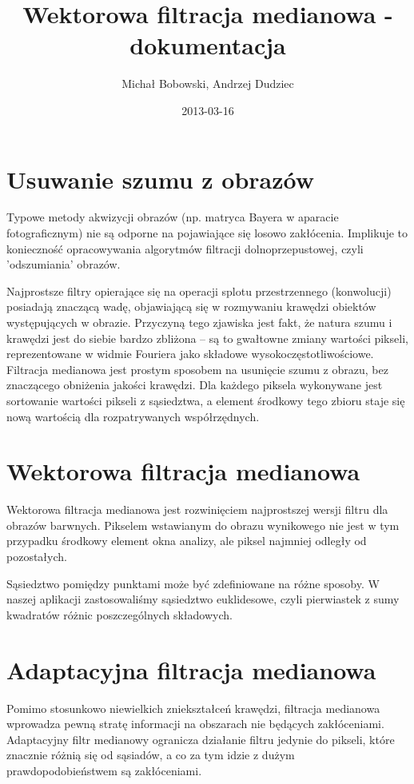 \documentclass[a4paper,12pt,oneside,notitlepage,onecolumn]{article}
\author{Michał Bobowski, Andrzej Dudziec}
\date{2013-03-16}
\title{Wektorowa filtracja medianowa - dokumentacja}
\begin{document}
  \maketitle
\section{Usuwanie szumu z obrazów}
Typowe metody akwizycji obrazów (np. matryca Bayera w aparacie fotograficznym) nie są odporne na pojawiające się losowo zakłócenia.
Implikuje to konieczność opracowywania algorytmów filtracji dolnoprzepustowej, czyli 'odszumiania' obrazów.

Najprostsze filtry opierające się na operacji splotu przestrzennego (konwolucji) posiadają znaczącą wadę, objawiającą się w rozmywaniu krawędzi obiektów występujących w obrazie.
Przyczyną tego zjawiska jest fakt, że natura szumu i krawędzi jest do siebie bardzo zbliżona – są to gwałtowne zmiany wartości pikseli, reprezentowane w widmie Fouriera jako składowe wysokoczęstotliwościowe.
Filtracja medianowa jest prostym sposobem na usunięcie szumu z obrazu, bez znaczącego obniżenia jakości krawędzi.
Dla każdego piksela wykonywane jest sortowanie wartości pikseli z sąsiedztwa, a element środkowy tego zbioru staje się nową wartością dla rozpatrywanych współrzędnych.

\section{Wektorowa filtracja medianowa}
Wektorowa filtracja medianowa jest rozwinięciem najprostszej wersji filtru dla obrazów barwnych.
Pikselem wstawianym do obrazu wynikowego nie jest w tym przypadku środkowy element okna analizy, ale piksel najmniej odległy od pozostałych.

Sąsiedztwo pomiędzy punktami może być zdefiniowane na różne sposoby. 
W naszej aplikacji zastosowaliśmy sąsiedztwo euklidesowe, czyli pierwiastek z sumy kwadratów różnic poszczególnych składowych.

\section{Adaptacyjna filtracja medianowa}
Pomimo stosunkowo niewielkich zniekształceń krawędzi, filtracja medianowa wprowadza pewną stratę informacji na obszarach nie będących zakłóceniami.
Adaptacyjny filtr medianowy ogranicza działanie filtru jedynie do pikseli, które znacznie różnią się od sąsiadów, a co za tym idzie z dużym prawdopodobieństwem są zakłóceniami.
\end{document}
